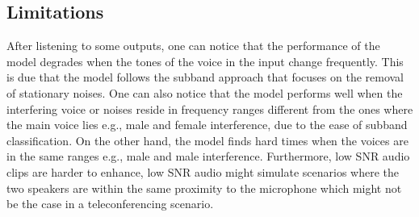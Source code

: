 \subsection{Limitations}
After listening to some outputs, one can notice that the performance of the model degrades when the tones of the voice in the input change frequently.
This is due that the model follows the subband approach that focuses on the removal of stationary noises.
One can also notice that the model performs well when the interfering voice or noises reside in frequency ranges different from the ones where the main voice lies e.g., male and female interference,
due to the ease of subband classification. On the other hand, the model finds hard times when the voices are in the same ranges e.g., male and male interference.
Furthermore, low SNR audio clips are harder to enhance, low SNR audio might simulate scenarios where the two speakers are within the same proximity to the microphone which might not be the case in a teleconferencing scenario.